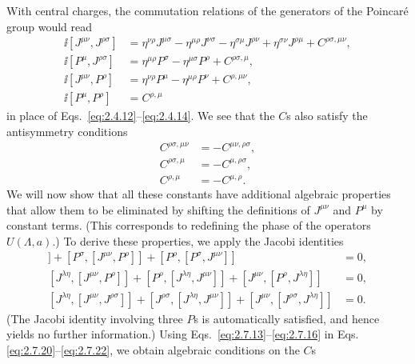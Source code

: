 With central charges, the commutation relations of the generators of the
Poincar\'e group would read
\begin{align}
  \ii[J^{\mu\nu},J^{\rho\sigma}]
  &={}
    \eta^{\nu\rho}J^{\mu\sigma}
    -\eta^{\mu\rho}J^{\nu\sigma}
    -\eta^{\sigma\mu}J^{\rho\nu}
    +\eta^{\sigma\nu}J^{\rho\mu}
    +C^{\rho\sigma,\mu\nu},
  \tag{2.7.13}\label{eq:2.7.13}\\
  \ii[P^\mu,J^{\rho\sigma}]
  &={}
    \eta^{\mu\rho}P^\sigma-\eta^{\mu\sigma}P^\rho
    +C^{\rho\sigma,\mu},
  \tag{2.7.14}\label{eq:2.7.14}\\
  \ii[J^{\mu\nu},P^\rho]
  &={}
    \eta^{\nu\rho}P^\mu-\eta^{\mu\rho}P^\nu
    +C^{\rho,\mu\nu},
  \tag{2.7.15}\label{eq:2.7.15}\\
  \ii[P^\mu,P^\rho]&=C^{\rho,\mu}
  \tag{2.7.16}\label{eq:2.7.16}
\end{align}
in place of Eqs.~\eqref{eq:2.4.12}--\eqref{eq:2.4.14}. We see that the $C$s also satisfy the
antisymmetry conditions
\begin{align}
  C^{\rho\sigma,\mu\nu}&=-C^{\mu\nu,\rho\sigma},
  \tag{2.7.17}\label{eq:2.7.17}\\
  C^{\rho\sigma,\mu}&=-C^{\mu,\rho\sigma},
  \tag{2.7.18}\label{eq:2.7.18}\\
  C^{\rho,\mu}&=-C^{\mu,\rho}.
  \tag{2.7.19}\label{eq:2.7.19}
\end{align}
We will now show that all these constants have additional algebraic properties
that allow them to be eliminated by shifting the definitions of $J^{\mu\nu}$
and $P^\mu$ by constant terms. (This corresponds to redefining the phase of the
operators $U(\Lambda,a)$.) To derive these properties, we apply the Jacobi
identities
\begin{align}
  [J^{\mu\nu},[P^\rho,P^\sigma]]
  +[P^\sigma,[J^{\mu\nu},P^\rho]]
  +[P^\rho,[P^\sigma,J^{\mu\nu}]]&=0,
  \tag{2.7.20}\label{eq:2.7.20}\\
  [J^{\lambda\eta},[J^{\mu\nu},P^\rho]]
  +[P^\rho,[J^{\lambda\eta},J^{\mu\nu}]]
  +[J^{\mu\nu},[P^\rho,J^{\lambda\eta}]]&=0,
  \tag{2.7.21}\label{eq:2.7.21}\\
  [J^{\lambda\eta},[J^{\mu\nu},J^{\rho\sigma}]]
  +[J^{\rho\sigma},[J^{\lambda\eta},J^{\mu\nu}]]
  +[J^{\mu\nu},[J^{\rho\sigma},J^{\lambda\eta}]]&=0.
  \tag{2.7.22}\label{eq:2.7.22}
\end{align}
(The Jacobi identity involving three $P$s is automatically satisfied, and hence
yields no further information.) Using Eqs.~\eqref{eq:2.7.13}--\eqref{eq:2.7.16} in Eqs.
\eqref{eq:2.7.20}--\eqref{eq:2.7.22}, we obtain algebraic conditions on the $C$s

